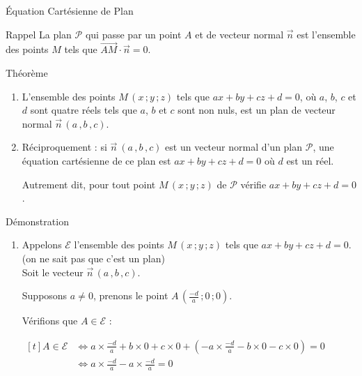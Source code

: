 \documentclass{cours}
\begin{document}
    \begin{Gpartie}{Équation Cartésienne de Plan} 
        \begin{Spartie}{Rappel} 
            La plan $\mathcal{P}$ qui passe par un point $A$ et de vecteur normal $\vec{n}$ est l'ensemble des points $M$ tels que $\overrightarrow{AM}\cdot\vec{n}=0$.
        \end{Spartie}
        \begin{Spartie}{Théorème} 
            \begin{enumerate}[(1)]
                \item   L'ensemble des points $M\,\left(x\,; y\,; z\right)$ tels que $ax+by+cz+d=0$, où $a$, $b$, $c$ et $d$ sont quatre réels tels que $a$, $b$ et $c$ sont non nuls, est un plan de vecteur normal $\vec{n}\,\left(a\,, b\,, c\right)$.
                
                \item   Réciproquement : si $\vec{n}~\left(a\,, b\,, c\right)$ est un vecteur normal d'un plan $\mathcal{P}$, une équation cartésienne de ce plan est $ax+by+cz+d=0$ où $d$ est un réel.
                
                Autrement dit, pour tout point $M\,\left(x\,; y\,; z\right)$ de $\mathcal{P}$ vérifie $ax+by+cz+d=0$.
            \end{enumerate}
            \pagebreak
            \begin{SSpartie}{Démonstration} 
                \begin{enumerate}[(1)]
                    \item   Appelons $\mathcal{E}$ l'ensemble des points $M\,\left(x\,; y\,; z\right)$ tels que $ax+by+cz+d=0$. (on ne sait pas que c'est un plan) \\ Soit le vecteur $\vec{n}\,\left(a\,, b\,, c\right)$.
                    
                    Supposons $a\neq 0$, prenons le point $A\,\left(\frac{-d}{a}\,; 0\,; 0\right)$.

                    Vérifions que $A\in\mathcal{E}$ :

                    $\begin{aligned}[t]
                        A\in\mathcal{E}&\iff a\times\tfrac{-d}{a}+b\times0+c\times0+\left(-a\times\tfrac{-d}{a}-b\times0-c\times0\right)=0 \\
                        &\iff a\times\tfrac{-d}{a}-a\times\tfrac{-d}{a}=0
                    \end{aligned}$


\end{enumerate}
\end{SSpartie}
\end{Spartie}
\end{Gpartie}
\end{document}
